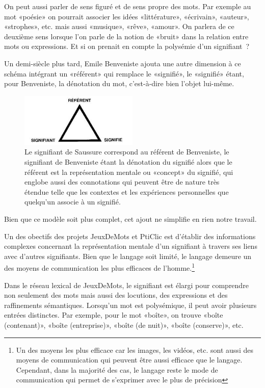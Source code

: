 \documentclass[a4paper,11pt,french]{article}
\begin{document}
On peut aussi parler de sens figuré et de sens propre des mots. Par exemple au mot «poésie» on pourrait associer les idées «littérature», «écrivain», «auteur», «strophes», etc. mais aussi «musique», «rêve», «amour». On parlera de ce deuxième sens lorsque l'on parle de la notion de «bruit» dans la relation entre mots ou expressions. Et si on prenait en compte la polysémie d'un signifiant~?


Un demi-siècle plus tard, Emile Benveniste ajouta une autre dimension à ce schéma intégrant un «référent» qui remplace le «signifié», le «signifié» étant, pour Benveniste, la dénotation du mot, c'est-à-dire bien l'objet lui-même. 

\begin{figure}[h!]
  \centering
      \includegraphics[width=0.5\textwidth]{img/trianglesemiotique.jpeg}
  \caption{Le signifiant de Saussure correspond au référent de Benveniste, le signifiant de Benveniste étant la dénotation du signifié alors que le référent est la représentation mentale ou «concept» du signifié, qui englobe aussi des connotations qui peuvent être de nature très étendue telle que les contextes et les expériences personnelles que quelqu'un associe à un signifié.}
\end{figure}

Bien que ce modèle soit plus complet, cet ajout ne simplifie en rien notre travail. 

Un des obectifs des projets JeuxDeMots et PtiClic est d'établir des informations complexes concernant la représentation mentale d'un signifiant à travers ses liens avec d'autres signifiants. Bien que le langage soit limité, le langage demeure un des moyens de communication les plus efficaces de l'homme.\footnote{Un des moyens les plus efficace car les images, les vidéos, etc. sont aussi des moyens de communication qui peuvent être aussi efficace que le langage. Cependant, dans la majorité des cas, le langage reste le mode de communication qui permet de s'exprimer avec le plus de précision} 

Dans le réseau lexical de JeuxDeMots, le signifiant est élargi pour comprendre non seulement des mots mais aussi des locutions, des expressions et des raffinements sémantiques. Lorsqu'un mot est polysémique, il peut avoir plusieurs entrées distinctes. Par exemple, pour le mot «boîte», on trouve «boîte (contenant)», «boîte (entreprise)», «boîte (de nuit)», «boîte (conserve)», etc.
\end{document}
